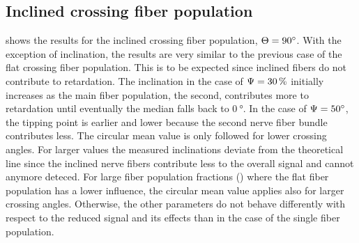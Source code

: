 \subsection{Inclined crossing fiber population}
 shows the results for the inclined crossing fiber population, \ie{} $\textnormal{$\Theta$}=\SI{90}{\degree}$.
With the exception of inclination, the results are very similar to the previous case of the flat crossing fiber population.
This is to be expected since inclined fibers do not contribute to retardation.
The inclination in the case of $\textnormal{$\Psi$}=\SI{30}{\percent}$ initially increases as the main fiber population, \ie{} the second, contributes more to retardation until eventually the median falls back to $\SI{0}{\degree}$.
In the case of $\textnormal{$\Psi$}=\SI{50}{\degree}$, the tipping point is earlier and lower because the second nerve fiber bundle contributes less.
The circular mean value is only followed for lower crossing angles.
For larger values the measured inclinations deviate from the theoretical line since the inclined nerve fibers contribute less to the overall signal and cannot anymore deteced.
For large fiber population fractions () where the flat fiber population has a lower influence, the circular mean value applies also for larger crossing angles.
Otherwise, the other parameters do not behave differently with respect to the reduced signal and its effects than in the case of the single fiber population.
%
%
%

